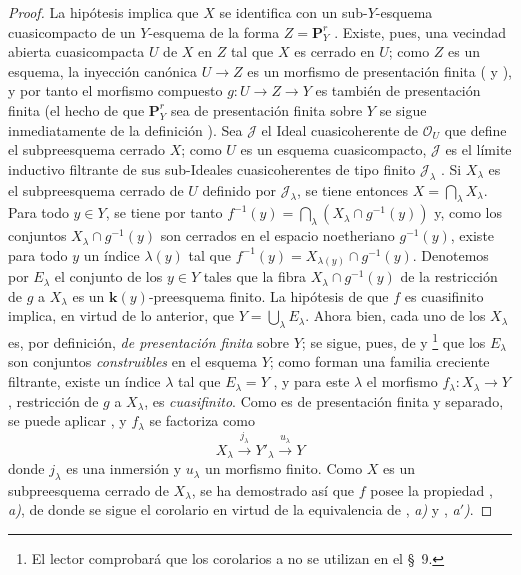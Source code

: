 \begin{proof}
La hipótesis implica que $X$ se identifica con un sub-$Y$-esquema cuasicompacto de un $Y$-esquema de la forma $Z=\mathbf P_Y^r$ .
Existe, pues, una vecindad abierta cuasicompacta $U$ de $X$ en $Z$ tal que $X$ es cerrado en $U$; como $Z$ es un esquema, la inyección canónica $U\to Z$ es un morfismo de presentación finita ( y ), y por tanto el morfismo compuesto $g:U\to Z\to Y$ es también de presentación finita (el hecho de que $\mathbf P_Y^r$ sea de presentación finita sobre $Y$ se sigue inmediatamente de la definición ).
Sea $\mathcal J$ el Ideal cuasicoherente de $\mathcal O_U$ que define el subpreesquema cerrado $X$; como $U$ es un esquema cuasicompacto, $\mathcal J$ es el límite inductivo filtrante de sus sub-Ideales cuasicoherentes de tipo finito $\mathcal J_\lambda$ .
Si $X_\lambda$ es el subpreesquema cerrado de $U$ definido por $\mathcal J_\lambda$, se tiene entonces $X=\bigcap_\lambda X_\lambda$.
Para todo $y\in Y$, se tiene por tanto $f^{-1}(y)=\bigcap_\lambda(X_\lambda\cap g^{-1}(y))$ y, como los conjuntos $X_\lambda\cap g^{-1}(y)$ son cerrados en el espacio noetheriano $g^{-1}(y)$, existe para todo $y$ un índice $\lambda(y)$ tal que $f^{-1}(y)=X_{\lambda(y)}\cap g^{-1}(y)$.
Denotemos por $E_\lambda$ el conjunto de los $y\in Y$ tales que la fibra $X_\lambda\cap g^{-1}(y)$ de la restricción de $g$ a $X_\lambda$ es un $\boldsymbol{k}(y)$-preesquema finito.
La hipótesis de que $f$ es cuasifinito implica, en virtud de lo anterior, que $Y=\bigcup_\lambda E_\lambda$.
Ahora bien, cada uno de los $X_\lambda$ es, por definición, \emph{de presentación finita} sobre $Y$; se sigue, pues, de  y \footnote{El lector comprobará que los corolarios  a  no se utilizan en el \S~9.} que los $E_\lambda$ son conjuntos \emph{construibles} en el esquema $Y$; como forman una familia creciente filtrante, existe un índice $\lambda$ tal que $E_\lambda=Y$ , y para este $\lambda$ el morfismo $f_\lambda:X_\lambda\to Y$, restricción de $g$ a $X_\lambda$, es \emph{cuasifinito}. Como es de presentación finita y separado, se puede aplicar , y $f_\lambda$ se factoriza como
\[
X_\lambda\xrightarrow{j_\lambda}Y'_\lambda
\xrightarrow{u_\lambda}Y
\]
donde $j_\lambda$ es una inmersión y $u_\lambda$ un morfismo finito.
Como $X$ es un subpreesquema cerrado de $X_\lambda$, se ha demostrado así que $f$ posee la propiedad , \emph{a)}, de donde se sigue el corolario en virtud de la equivalencia de , \emph{a)} y , \emph{a$'$)}.
\end{proof}

